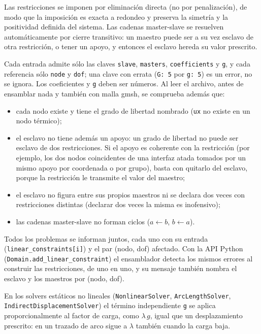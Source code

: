 \documentclass[11pt,oneside]{report}
\begin{document}
Las restricciones se imponen por eliminación directa (no por penalización), de modo que la imposición es exacta a redondeo y preserva la simetría y la positividad definida del sistema. Las cadenas master-slave se resuelven automáticamente por cierre transitivo: un maestro puede ser a su vez esclavo de otra restricción, o tener un apoyo, y entonces el esclavo hereda su valor prescrito.

Cada entrada admite sólo las claves \texttt{slave}, \texttt{masters}, \texttt{coefficients} y \texttt{g}, y cada referencia sólo \texttt{node} y \texttt{dof}; una clave con errata (\texttt{G: 5} por \texttt{g: 5}) es un error, no se ignora. Los coeficientes y \texttt{g} deben ser números. Al leer el archivo, antes de ensamblar nada y también con malla gmsh, se comprueba además que:

\begin{itemize}
  \item cada nodo existe y tiene el grado de libertad nombrado (\texttt{ux} no existe en un nodo térmico);
  \item el esclavo no tiene además un apoyo: un grado de libertad no puede ser esclavo de dos restricciones. Si el apoyo es coherente con la restricción (por ejemplo, los dos nodos coincidentes de una interfaz atada tomados por un mismo apoyo por coordenada o por grupo), basta con quitarlo del esclavo, porque la restricción le transmite el valor del maestro;
  \item el esclavo no figura entre sus propios maestros ni se declara dos veces con restricciones distintas (declarar dos veces la misma es inofensivo);
  \item las cadenas master-slave no forman ciclos ($a \leftarrow b$, $b \leftarrow a$).
\end{itemize}

Todos los problemas se informan juntos, cada uno con su entrada (\texttt{linear\_\allowbreak{}constraints[i]}) y el par (nodo, dof) afectado. Con la API Python (\texttt{Domain.\allowbreak{}add\_\allowbreak{}linear\_\allowbreak{}constraint}) el ensamblador detecta los mismos errores al construir las restricciones, de uno en uno, y su mensaje también nombra el esclavo y los maestros por (nodo, dof).

En los solvers estáticos no lineales (\texttt{NonlinearSolver}, \texttt{ArcLengthSolver}, \texttt{IndirectDisplacementSolver}) el término independiente \texttt{g} se aplica proporcionalmente al factor de carga, como $\lambda\,g$, igual que un desplazamiento prescrito: en un trazado de arco sigue a $\lambda$ también cuando la carga baja.
\end{document}

